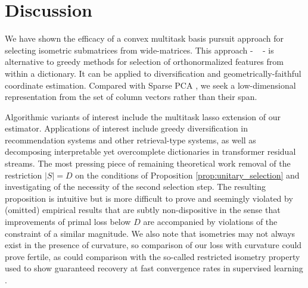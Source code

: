 \section{Discussion}
\label{sec:discussion}

We have shown the efficacy of a convex multitask basis pursuit approach for selecting isometric submatrices from wide-matrices.
This approach - \isometrypursuit~ - is alternative to greedy methods for selection of orthonormalized features from within a dictionary.
It can be applied to diversification and geometrically-faithful coordinate estimation.
Compared with Sparse PCA \citep{Dey2017-mx, Bertsimas2022-qo, Bertsimas2022-dv}, we seek a low-dimensional representation from the set of column vectors rather than their span.

Algorithmic variants of interest include the multitask lasso extension of our estimator.
Applications of interest include greedy diversification in recommendation systems \cite{Carbonell2017-gi, Wu2019-uk} and other retrieval-type systems, as well as decomposing interpretable yet overcomplete dictionaries in transformer residual streams.
The most pressing piece of remaining theoretical work removal of the restriction $|S| = D$ on the conditions of Proposition \ref{prop:unitary_selection} and investigating of the necessity of the second selection step.
The resulting proposition is intuitive but is more difficult to prove and seemingly violated by (omitted) empirical results that are subtly non-dispositive in the sense that improvements of primal loss below $D$ are accompanied by violations of the constraint of a similar magnitude.
We also note that isometries may not always exist in the presence of curvature, so comparison of our loss with curvature could prove fertile, as could comparison with the so-called restricted isometry property used to show guaranteed recovery at fast convergence rates in supervised learning \cite{Candes2005-dd, Hastie2015-qa}.

